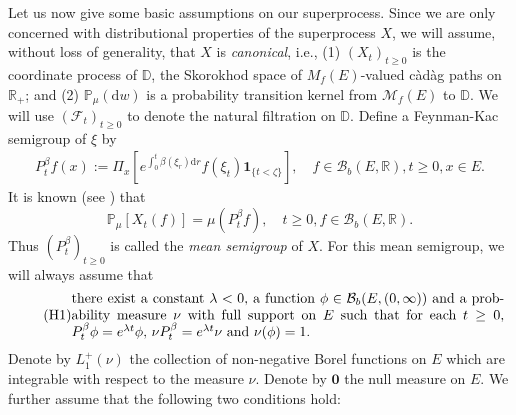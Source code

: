 \documentclass[12pt,a4paper]{amsart}
\numberwithin{equation}{section}
\theoremstyle{plain}
\theoremstyle{definition}
\theoremstyle{remark}
\begin{document}
	Let us now give some basic assumptions on our superprocess. 
	Since we are only concerned with distributional properties of the superprocess $X$, we will assume, without loss of generality, that $X$ is \emph{canonical},  i.e., 
	(1) $(X_t)_{t\geq 0}$ is the coordinate process of $\mathbb D$, the Skorokhod space of $M_f(E)$-valued c\`ad\`ag paths on $\mathbb R_+$; and %
	(2) $\mathbb P_\mu(\mathrm dw)$ is a probability transition kernel from $\mathcal M_f(E)$ to $\mathbb D$. 
	We will use $(\mathscr F_t)_{t\geq 0}$ to denote the natural filtration on $\mathbb D$. 
	Define a Feynman-Kac semigroup of $\xi$ by
\begin{align}
	P_t^\beta f(x)
	:= \Pi_x[e^{\int_0^t \beta(\xi_r) {\mathrm d}r }f(\xi_t) \mathbf 1_{\{t < \zeta\}}], 
	\quad f\in \mathcal B_b(E,\mathbb R), t\geq 0, x\in E. 
\end{align}
	It is known (see \cite[Proposition 2.27]{Li2011Measure-valued}) that 
\begin{equation} \label{eq:M.2}
	\mathbb P_\mu[X_t(f)] = \mu (P_t^\beta f),
	\quad t\geq 0, f \in \mathcal B_b(E,\mathbb R). 
\end{equation}
	Thus $(P_t^\beta)_{t\geq 0}$ is called the \emph{mean semigroup}  of $X$.
	For this mean semigroup, we will always assume that
\begin{equation}\label{asp:H1} \tag{H1}
\begin{minipage}{0.9\textwidth}
	there exist a constant $\lambda < 0$, a function $\phi \in \mathcal B_b(E,(0,\infty))$ and a probability measure $\nu$ with full support on $E$ such that for each $t\geq 0$, $P_t^\beta \phi = e^{\lambda t} \phi$, $\nu P_t^\beta = e^{\lambda t} \nu$ and $\nu(\phi) =1$. 
\end{minipage}
\end{equation}
	Denote by $L_1^+(\nu)$ the collection of non-negative Borel functions on $E$ which are integrable with respect to the measure $\nu$.
	Denote by $\mathbf 0$ the null measure on $E$.
	We further assume that the following two conditions hold:
\end{document}
